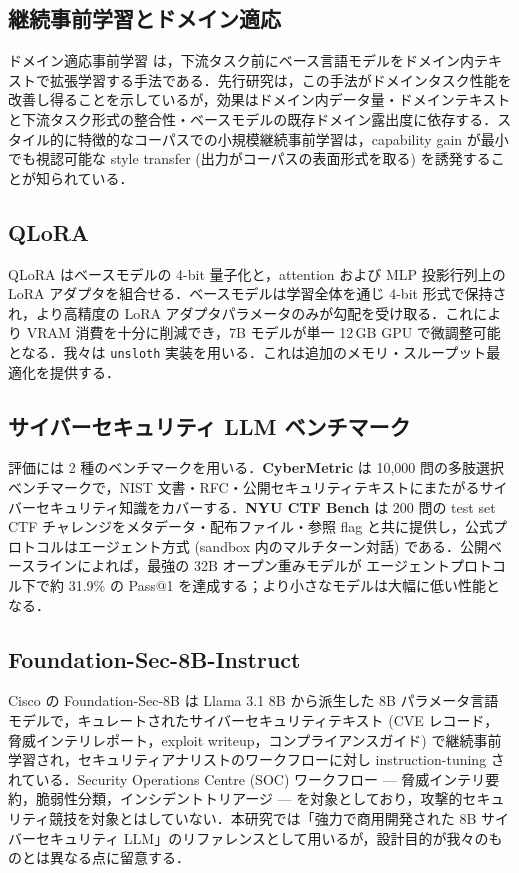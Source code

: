 \documentclass[10pt,twocolumn,a4paper]{ltjsarticle}
\begin{document}
\subsection{継続事前学習とドメイン適応}

ドメイン適応事前学習 \cite{gururangan2020dont} は，下流タスク前にベース言語モデルをドメイン内テキストで拡張学習する手法である．先行研究は，この手法がドメインタスク性能を改善し得ることを示しているが，効果はドメイン内データ量・ドメインテキストと下流タスク形式の整合性・ベースモデルの既存ドメイン露出度に依存する．スタイル的に特徴的なコーパスでの小規模継続事前学習は，capability gain が最小でも視認可能な style transfer (出力がコーパスの表面形式を取る) を誘発することが知られている．

\subsection{QLoRA}

QLoRA \cite{dettmers2023qlora} はベースモデルの 4-bit 量子化と，attention および MLP 投影行列上の LoRA \cite{hu2022lora} アダプタを組合せる．ベースモデルは学習全体を通じ 4-bit 形式で保持され，より高精度の LoRA アダプタパラメータのみが勾配を受け取る．これにより VRAM 消費を十分に削減でき，7B モデルが単一 12\,GB GPU で微調整可能となる．我々は \texttt{unsloth} \cite{unsloth2024} 実装を用いる．これは追加のメモリ・スループット最適化を提供する．

\subsection{サイバーセキュリティ LLM ベンチマーク}

評価には 2 種のベンチマークを用いる．\textbf{CyberMetric} \cite{tihanyi2024cybermetric} は 10{,}000 問の多肢選択ベンチマークで，NIST 文書・RFC・公開セキュリティテキストにまたがるサイバーセキュリティ知識をカバーする．\textbf{NYU CTF Bench} \cite{shao2024nyuctf} は 200 問の test set CTF チャレンジをメタデータ・配布ファイル・参照 flag と共に提供し，公式プロトコルはエージェント方式 (sandbox 内のマルチターン対話) である．公開ベースラインによれば，最強の 32B オープン重みモデルが エージェントプロトコル下で約 31.9\% の Pass@1 を達成する；より小さなモデルは大幅に低い性能となる．

\subsection{Foundation-Sec-8B-Instruct}

Cisco の Foundation-Sec-8B \cite{cisco2025foundationsec} は Llama 3.1 8B から派生した 8B パラメータ言語モデルで，キュレートされたサイバーセキュリティテキスト (CVE レコード，脅威インテリレポート，exploit writeup，コンプライアンスガイド) で継続事前学習され，セキュリティアナリストのワークフローに対し instruction-tuning されている．Security Operations Centre (SOC) ワークフロー --- 脅威インテリ要約，脆弱性分類，インシデントトリアージ --- を対象としており，攻撃的セキュリティ競技を対象とはしていない．本研究では「強力で商用開発された 8B サイバーセキュリティ LLM」のリファレンスとして用いるが，設計目的が我々のものとは異なる点に留意する．
\end{document}
